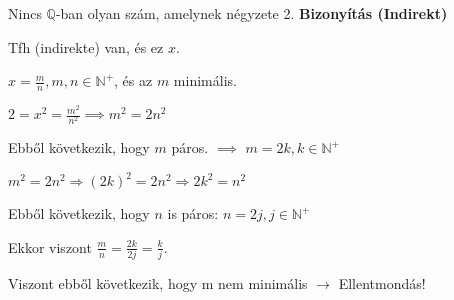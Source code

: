 \begin{frame}
  \begin{tcolorbox}[title={Tétel: $\sqrt{2}$ nem racionális}]
    Nincs $\mathbb{Q}$-ban olyan szám, amelynek négyzete 2.
  \tcblower
    \textbf{Bizonyítás (Indirekt)}\\
    \mmedskip
    
    Tfh (indirekte) van, és ez $x$.\\
    \msmallskip
    
    $x = \frac{m}{n}, m,n \in \mathbb{N}^+$, és az $m$ minimális.\\
    \msmallskip
    
    $2 = x^2 = \frac{m^2}{n^2} \implies m^2 = 2n^2$\\
    \msmallskip
    
    Ebből következik, hogy $m$ páros. $\implies$ $m = 2k, k \in \mathbb{N}^+$\\
    \msmallskip
    
    $m^2 = 2n^2 \Rightarrow (2k)^2 = 2n^2 \Rightarrow 2k^2 = n^2$\\
    \msmallskip
    
    Ebből következik, hogy $n$ is páros: $n = 2j, j \in \mathbb{N}^+$\\
    \msmallskip
    
    Ekkor viszont $\frac{m}{n} = \frac{2k}{2j} = \frac{k}{j}$.\\
    \msmallskip
    
    Viszont ebből következik, hogy m nem minimális $\rightarrow$ Ellentmondás!
  \end{tcolorbox}
\end{frame}

